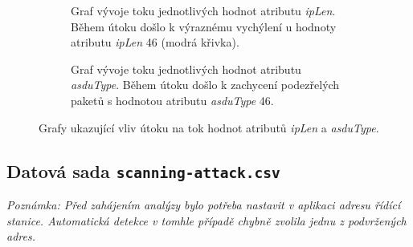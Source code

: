 \begin{figure}[H]%
    \centering
    \begin{subfigure}{\textwidth}
        \centering
        \captionsetup{width=0.9\linewidth}
        \caption{Graf vývoje toku jednotlivých hodnot atributu \emph{ipLen}. Během útoku došlo k výraznému vychýlení u hodnoty atributu \emph{ipLen} 46 (modrá křivka).}
        \label{fig:switch_iplen}
    \end{subfigure}
    
    \begin{subfigure}{\textwidth}
        \centering
        \captionsetup{width=0.9\linewidth}
        \caption{Graf vývoje toku jednotlivých hodnot atributu \emph{asduType}. Během útoku došlo k zachycení podezřelých paketů s hodnotou atributu \emph{asduType} 46.}
        \label{fig:switch_asdu}
    \end{subfigure}
    
    
    \caption{Grafy ukazující vliv útoku na tok hodnot atributů \emph{ipLen} a \emph{asduType}.}%
    \label{fig:switch_both}%
\end{figure}











\newpage

\subsection*{Datová sada \texttt{scanning-attack.csv}}


\emph{Poznámka: Před zahájením analýzy bylo potřeba nastavit v aplikaci adresu řídící stanice. Automatická detekce v tomhle případě chybně zvolila jednu z podvržených adres.}

